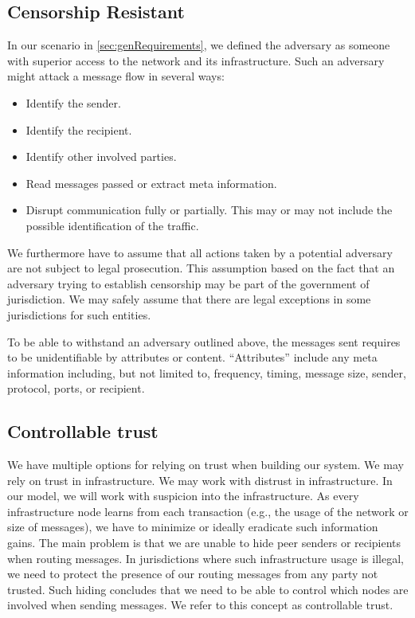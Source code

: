 \subsection{Censorship Resistant}
In our scenario in \ref{sec:genRequirements}, we defined the adversary as someone with superior access to the network and its infrastructure. Such an adversary might attack a message flow in several ways:
\begin{itemize}
	\item Identify the sender.
	\item Identify the recipient.
	\item Identify other involved parties.
	\item Read messages passed or extract meta information.
	\item Disrupt communication fully or partially. This may or may not include the possible identification of the traffic.
\end{itemize}

We furthermore have to assume that all actions taken by a potential adversary are not subject to legal prosecution. This assumption based on the fact that an adversary trying to establish censorship may be part of the government of jurisdiction. We may safely assume that there are legal exceptions in some jurisdictions for such entities.

To be able to withstand an adversary outlined above, the messages sent requires to be unidentifiable by attributes or content. ``Attributes'' include any meta information including, but not limited to, frequency, timing, message size, sender, protocol, ports, or recipient.

\subsection{Controllable trust}
We have multiple options for relying on trust when building our system. We may rely on trust in infrastructure. We may work with distrust in infrastructure. In our model, we will work with suspicion into the infrastructure. As every infrastructure node learns from each transaction (e.g., the usage of the network or size of messages), we have to minimize or ideally eradicate such information gains. The main problem is that we are unable to hide peer senders or recipients when routing messages. In jurisdictions where such infrastructure usage is illegal, we need to protect the presence of our routing messages from any party not trusted. Such hiding concludes that we need to be able to control which nodes are involved when sending messages. We refer to this concept as controllable trust.

